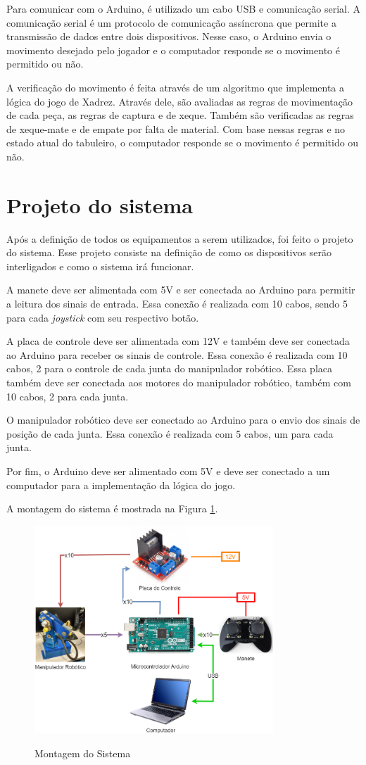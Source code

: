 Para comunicar com o Arduino, é utilizado um cabo USB e comunicação serial.
A comunicação serial é um protocolo de comunicação assíncrona que permite a transmissão de dados entre dois dispositivos.
Nesse caso, o Arduino envia o movimento desejado pelo jogador e o computador responde se o movimento é permitido ou não.

A verificação do movimento é feita através de um algoritmo que implementa a lógica do jogo de Xadrez.
Através dele, são avaliadas as regras de movimentação de cada peça, as regras de captura e de xeque.
Também são verificadas as regras de xeque-mate e de empate por falta de material.
Com base nessas regras e no estado atual do tabuleiro, o computador responde se o movimento é permitido ou não.

\section[Projeto do sistema]{Projeto do sistema}
\label{sec:projetoSistema}

Após a definição de todos os equipamentos a serem utilizados, foi feito o projeto do sistema.
Esse projeto consiste na definição de como os dispositivos serão interligados e como o sistema irá funcionar.

A manete deve ser alimentada com 5V e ser conectada ao Arduino para permitir a leitura dos sinais de entrada.
Essa conexão é realizada com 10 cabos, sendo 5 para cada \textit{joystick} com seu respectivo botão.

A placa de controle deve ser alimentada com 12V e também deve ser conectada ao Arduino para receber os sinais de controle.
Essa conexão é realizada com 10 cabos, 2 para o controle de cada junta do manipulador robótico.
Essa placa também deve ser conectada aos motores do manipulador robótico, também com 10 cabos, 2 para cada junta.

O manipulador robótico deve ser conectado ao Arduino para o envio dos sinais de posição de cada junta.
Essa conexão é realizada com 5 cabos, um para cada junta.

Por fim, o Arduino deve ser alimentado com 5V e deve ser conectado a um computador para a implementação da lógica do jogo.

A montagem do sistema é mostrada na Figura \ref{fig:montagemSistema}.

\begin{figure}[H]
    \centering
    \caption{Montagem do Sistema}
    \includegraphics[keepaspectratio=true, width=0.8\textwidth]
    	{img/projeto-sistema.png}
    \label{fig:montagemSistema}
\end{figure}


